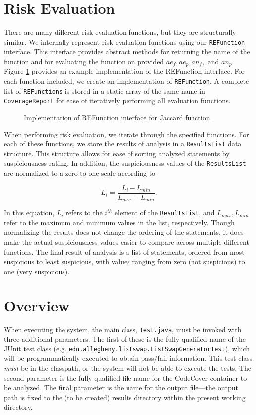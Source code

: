 \section{Risk Evaluation} \label{sec:re}

There are many different risk evaluation functions, but they are structurally similar.  We internally
represent risk evaluation functions using our \texttt{REFunction} interface.  This interface provides
abstract methods for returning the name of the function and for evaluating the function on provided
$ae_f, ae_p, an_f, \text{ and } an_p$.  Figure \ref{fig:re} provides an example implementation of
the REFunction interface.  For each function included, we create an implementation of
\texttt{REFunction}.  A complete list of \texttt{REFunctions} is stored in a static array of the
same name in \texttt{CoverageReport} for ease of iteratively performing all evaluation functions.  

\begin{figure}[tb]
\centering

\caption{Implementation of REFunction interface for Jaccard function.}
\label{fig:re}
\end{figure}

When performing risk evaluation, we iterate through the specified functions.  For each of these
functions, we store the results of analysis in a \texttt{ResultsList} data structure.  This
structure allows for ease of sorting analyzed statements by suspiciousness rating.  In addition, the
suspiciousness values of the \texttt{ResultsList} are normalized to a zero-to-one scale according to

\[ L_i = \frac{ L_i - L_{min} }{ L_{max} - L_{min} }. \]

In this equation, $L_i$ refers to the $i^{th}$ element of the \texttt{ResultsList}, and $L_{max}, L_{min}$ refer to the maximum and minimum values in the list, respectively.  Though normalizing the results does
not change the ordering of the statements, it does make the actual suspiciousness values easier to compare
across multiple different functions.  The final result of analysis is a list of statements, ordered from
most suspicious to least suspicious, with values ranging from zero (not suspicious) to one (very 
suspicious).

\section{Overview} \label{sec:over}

When executing the system, the main class, \texttt{Test.java}, must be invoked with three additional
parameters.  The first of these is the fully qualified name of the JUnit test class (e.g. \texttt{edu.allegheny.listswap.ListSwapGeneratorTest}), which will be programmatically executed to
obtain pass/fail information.  This test class \emph{must} be in the classpath, or the system will
not be able to execute the tests.  The second parameter is the fully qualified file name for the 
CodeCover container to be analyzed.  The final parameter is the name for the output file---the 
output path is fixed to the (to be created) results directory within the present working directory.

